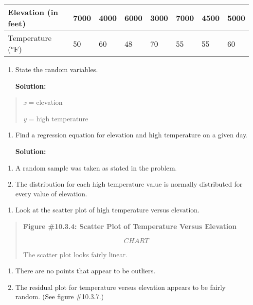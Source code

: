 \documentclass[]{book}
\providecommand{\tightlist}{%
  \setlength{\itemsep}{0pt}\setlength{\parskip}{0pt}}
\begin{document}
\begin{longtable}[]{@{}llllllll@{}}
\toprule
Elevation (in feet) & 7000 & 4000 & 6000 & 3000 & 7000 & 4500 & 5000\tabularnewline
\midrule
\endhead
Temperature (°F) & 50 & 60 & 48 & 70 & 55 & 55 & 60\tabularnewline
\bottomrule
\end{longtable}

\begin{enumerate}
\def\labelenumi{\alph{enumi}.}
\item
  State the random variables.

  \textbf{Solution:}
\end{enumerate}

\begin{quote}
\emph{x} = elevation

\emph{y} = high temperature
\end{quote}

\begin{enumerate}
\def\labelenumi{\alph{enumi}.}
\setcounter{enumi}{1}
\item
  Find a regression equation for elevation and high temperature on a
  given day.

  \textbf{Solution:}
\end{enumerate}

\begin{enumerate}
\def\labelenumi{\alph{enumi}.}
\item
  A random sample was taken as stated in the problem.
\item
  The distribution for each high temperature value is normally
  distributed for every value of elevation.
\end{enumerate}

\begin{enumerate}
\def\labelenumi{\roman{enumi}.}
\tightlist
\item
  Look at the scatter plot of high temperature versus elevation.
\end{enumerate}

\begin{quote}
\textbf{Figure \#10.3.4: Scatter Plot of Temperature Versus Elevation}

{\[CHART\]}

The scatter plot looks fairly linear.
\end{quote}

\begin{enumerate}
\def\labelenumi{\roman{enumi}.}
\setcounter{enumi}{1}
\item
  There are no points that appear to be outliers.
\item
  The residual plot for temperature versus elevation appears to be
  fairly random. (See figure \#10.3.7.)
\end{enumerate}
\end{document}
